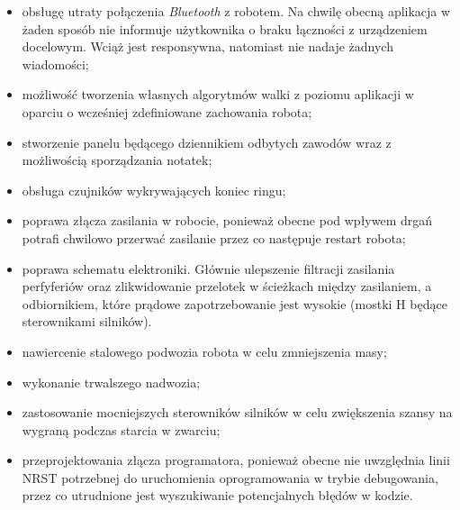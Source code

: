 \begin{itemize}
\item obsługę utraty połączenia \textit{Bluetooth} z robotem. Na chwilę obecną aplikacja w żaden sposób nie informuje użytkownika o braku łączności z urządzeniem docelowym. Wciąż jest responsywna, natomiast nie nadaje żadnych wiadomości;
\item możliwość tworzenia własnych algorytmów walki z poziomu aplikacji w oparciu o wcześniej zdefiniowane zachowania robota;
\item stworzenie panelu będącego dziennikiem odbytych zawodów wraz z możliwością sporządzania notatek;
\item obsługa czujników wykrywających koniec ringu;
\item poprawa złącza zasilania w robocie, ponieważ obecne pod wpływem drgań potrafi chwilowo przerwać zasilanie przez co następuje restart robota;
\item poprawa schematu elektroniki. Głównie ulepszenie filtracji zasilania perfyferiów oraz zlikwidowanie przelotek w ścieżkach między zasilaniem, a odbiornikiem, które prądowe zapotrzebowanie jest wysokie (mostki H będące sterownikami silników).
\item nawiercenie stalowego podwozia robota w celu zmniejszenia masy;
\item wykonanie trwalszego nadwozia;
\item zastosowanie mocniejszych sterowników silników w celu zwiększenia szansy na wygraną podczas starcia w zwarciu;
\item przeprojektowania złącza programatora, ponieważ obecne nie uwzględnia linii NRST potrzebnej do uruchomienia oprogramowania w trybie debugowania, przez co utrudnione jest wyszukiwanie potencjalnych błędów w kodzie. 
\end{itemize}

